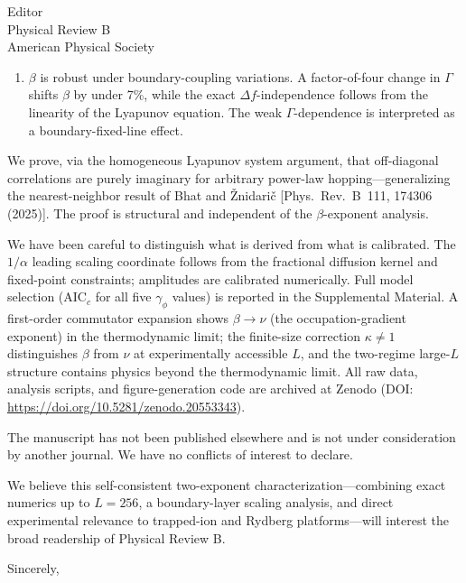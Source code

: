 \documentclass[11pt]{letter}
\begin{document}
\begin{letter}{Editor\\Physical Review B\\American Physical Society}
\begin{enumerate}
\item $\beta$ is robust under boundary-coupling variations. A factor-of-four change in $\Gamma$ shifts $\beta$ by under 7\%, while the exact $\Delta f$-independence follows from the linearity of the Lyapunov equation. The weak $\Gamma$-dependence is interpreted as a boundary-fixed-line effect.
\end{enumerate}

We prove, via the homogeneous Lyapunov system argument, that off-diagonal correlations are purely imaginary for arbitrary power-law hopping---generalizing the nearest-neighbor result of Bhat and \v{Z}nidari\v{c} [Phys.\ Rev.\ B~111, 174306 (2025)]. The proof is structural and independent of the $\beta$-exponent analysis.

We have been careful to distinguish what is derived from what is calibrated. The $1/\alpha$ leading scaling coordinate follows from the fractional diffusion kernel and fixed-point constraints; amplitudes are calibrated numerically. Full model selection (AIC$_c$ for all five $\gamma_\phi$ values) is reported in the Supplemental Material. A first-order commutator expansion shows $\beta \to \nu$ (the occupation-gradient exponent) in the thermodynamic limit; the finite-size correction $\kappa \neq 1$ distinguishes $\beta$ from $\nu$ at experimentally accessible $L$, and the two-regime large-$L$ structure contains physics beyond the thermodynamic limit. All raw data, analysis scripts, and figure-generation code are archived at Zenodo (DOI: \url{https://doi.org/10.5281/zenodo.20553343}).

The manuscript has not been published elsewhere and is not under consideration by another journal. We have no conflicts of interest to declare.

We believe this self-consistent two-exponent characterization---combining exact numerics up to $L=256$, a boundary-layer scaling analysis, and direct experimental relevance to trapped-ion and Rydberg platforms---will interest the broad readership of Physical Review B.

\closing{Sincerely,}

\end{letter}
\end{document}
